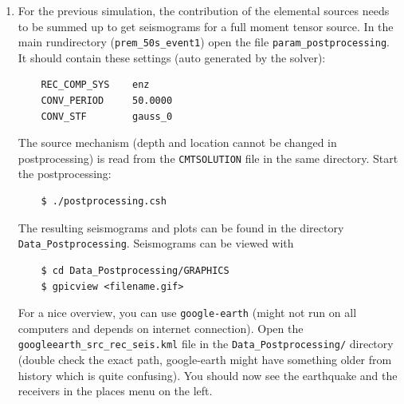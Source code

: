 \documentclass{article}
\begin{document}
\begin{enumerate}
    \item For the previous simulation, the contribution of the elemental sources needs
    to be summed up to get seismograms for a full moment tensor source. In the
    main rundirectory (\verb|prem_50s_event1|) open the file
    \verb|param_postprocessing|. It should contain these settings (auto generated by the
    solver):
    \begin{verbatim}
    REC_COMP_SYS    enz
    CONV_PERIOD     50.0000
    CONV_STF        gauss_0
    \end{verbatim}
    The source mechanism (depth and location cannot be changed in postprocessing) is read
    from the \verb|CMTSOLUTION| file in the same directory. Start the postprocessing:
    \begin{verbatim}
    $ ./postprocessing.csh
    \end{verbatim}
    The resulting seismograms and plots can be found in the directory 
    \verb|Data_Postprocessing|. Seismograms can be viewed with
    \begin{verbatim}
    $ cd Data_Postprocessing/GRAPHICS
    $ gpicview <filename.gif>
    \end{verbatim}
    For a nice overview, you can use \verb|google-earth| (might not run on all computers
    and depends on internet connection). Open the \verb|googleearth_src_rec_seis.kml| file
    in the \verb|Data_Postprocessing/| directory (double check the exact path,
    google-earth might have something older from history which is quite confusing).
    You should now see the earthquake and the receivers in the places menu on the left.
    

\end{enumerate}
\end{document}
